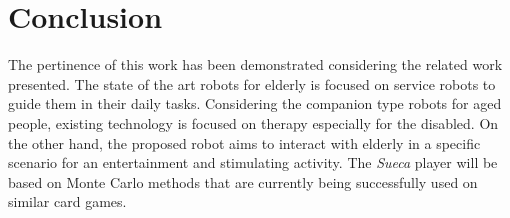 \section{Conclusion} \label{conclusion}

The pertinence of this work has been demonstrated considering the related work presented.
The state of the art robots for elderly is focused on service robots to guide them in their daily tasks.
Considering the companion type robots for aged people, existing technology is focused on therapy especially for the disabled.
On the other hand, the proposed robot aims to interact with elderly in a specific scenario for an entertainment and stimulating activity.
The \emph{Sueca} player will be based on Monte Carlo methods that are currently being successfully used on similar card games.
